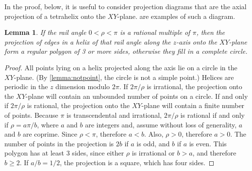 \documentclass[10pt,final]{journals-1.0/asme2ej}
\newtheorem{lemma}{Lemma}
\begin{document}
In the proof, below, it is useful to consider projection diagrams that are the axial projection
of a tetrahelix onto the $XY$-plane.  are examples
of such a diagram.
\begin{lemma}
  If the rail angle $0 < \rho < \pi$ is a rational multiple of $\pi$, then the projection of
  edges in a helix of that rail angle  along the $z$-axis onto the $XY$-plane form a
  regular polygon of 3 or more sides, otherwise they fill in a complete circle.
  \label{lemma:ngon}
\end{lemma}
\begin{proof}
  All points lying on a helix projected along the axis lie on a circle in the $XY$-plane.
(By \cref{lemma:notpoint}, the circle is not a simple point.)
  Helices are periodic in the $z$ dimension modulo $2\pi$.
  If $2\pi/\rho$ is irrational, the projection onto the $XY$-plane will contain
  an unbounded number of points on a circle.
  If and only if $2\pi/\rho$ is rational, the projection onto
  the $XY$-plane will contain a finite number of points.
  Because $\pi$ is transcendental and irrational,
  $2\pi/\rho$ is rational if and only if $\rho = a\pi/b$, where $a$ and $b$ are integers
  and, assume without loss of generality, $a$ and $b$ are coprime.
  Since $\rho < \pi$, therefore $a < b$. Also, $\rho > 0$, therefore $a > 0$.
  The number of points in the projection is $2b$ if $a$ is odd, and $b$ if $a$ is even.
  This polygon has at least 3 sides, since either $\rho$ is irrational or $b > a$, and therefore
  $b \geq 2$. If $a/b = 1/2$, the projection is a square, which has four sides. 
\end{proof}
\end{document}
